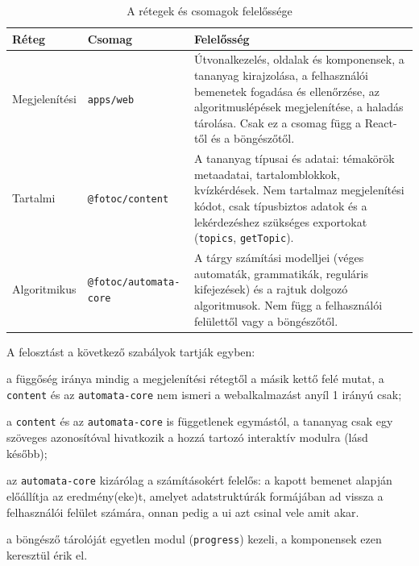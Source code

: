 \begin{table}[H]
    \centering
    \begin{tabularx}{\textwidth}{|>{\raggedright\arraybackslash}p{2.4cm}|>{\raggedright\arraybackslash}p{4.4cm}|X|}
        \hline
        \textbf{Réteg} & \textbf{Csomag} & \textbf{Felelősség} \\ \hline
        Megjelenítési & \texttt{apps/web} &
            Útvonalkezelés, oldalak és komponensek, a tananyag kirajzolása,
            a felhasználói bemenetek fogadása és ellenőrzése, az algoritmuslépések megjelenítése, a haladás tárolása. Csak ez a csomag függ a
            React-től és a böngészőtől. \\ \hline
        Tartalmi & \texttt{@fotoc/content} &
            A tananyag típusai és adatai: témakörök metaadatai,
            tartalomblokkok, kvízkérdések. Nem tartalmaz megjelenítési
            kódot, csak típusbiztos adatok és a lekérdezéshez szükséges
            exportokat (\texttt{topics}, \texttt{getTopic}). \\ \hline
            Algoritmikus & \texttt{@fotoc/automata-core} & A tárgy számítási modelljei (véges automaták, grammatikák, reguláris kifejezések)
             és a rajtuk dolgozó algoritmusok. Nem függ a felhasználói felülettől vagy a böngészőtől. \\ \hline
    \end{tabularx}
    \caption{A rétegek és csomagok felelőssége}
    \label{tab:arch-layers}
\end{table}

A felosztást a következő szabályok tartják egyben:
\begin{compactitem}
    \item a függőség iránya mindig a megjelenítési rétegtől a másik kettő
          felé mutat, a \texttt{content} és az \texttt{automata-core} nem
          ismeri a webalkalmazást anyíl 1 irányú csak;
    \item a \texttt{content} és az \texttt{automata-core} is
          függetlenek egymástól, a tananyag csak egy szöveges azonosítóval hivatkozik a
          hozzá tartozó interaktív modulra (lásd később);
    \item az \texttt{automata-core} kizárólag a számításokért felelős: 
    a kapott bemenet alapján előállítja az eredmény(eke)t, amelyet adatstruktúrák
     formájában ad vissza a felhasználói felület számára, onnan pedig a ui azt csinal vele amit akar.
    \item a böngésző tárolóját egyetlen modul (\texttt{progress}) kezeli,
          a komponensek ezen keresztül érik el.
\end{compactitem}
\clearpage

